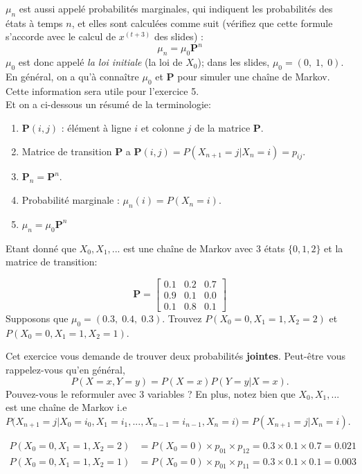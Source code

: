 \begin{Exercice}[15 minutes]
$\mu_n$ est aussi appelé probabilités marginales, qui indiquent les probabilités des états à temps $n$, et elles sont calculées comme suit (vérifiez que cette formule s'accorde avec le calcul de $x^{(t+3)}$ des slides) :
\[ 
\mu_n = \mu_0 \mathbf{P}^n
\]
$\mu_0$ est donc appelé \textit{la loi initiale} (la loi de $X_0$); dans les slides, $\mu_0 = (0,\; 1, \; 0)$. En général, on a qu'à connaître $\mu_0$ et $\mathbf{P}$ pour simuler une chaîne de Markov. Cette information sera utile pour l'exercice 5. \\

Et on a ci-dessous un résumé de la terminologie:

\begin{enumerate}
    \item $\mathbf{P}(i,j)$ : élément à ligne $i$ et colonne $j$ de la matrice $\mathbf{P}$.
    \item Matrice de transition $\mathbf{P}$ a $\mathbf{P}(i,j) = P(X_{n+1}=j|X_n=i)=p_{ij}$.
    \item $\mathbf{P}_n = \mathbf{P}^n$.
    \item Probabilité marginale : $\mu_n(i) = P(X_n = i)$.
    \item $\mu_n = \mu_0 \mathbf{P}^n$
\end{enumerate}

Etant donné que $X_0, X_1, ...$ est une chaîne de Markov avec 3 états $\{0, 1, 2\}$ et la matrice de transition:

\[ 
\mathbf{P} =
\begin{bmatrix}
0.1 & 0.2 & 0.7 \\
0.9 & 0.1 & 0.0 \\
0.1 & 0.8 & 0.1
\end{bmatrix}
\]
Supposons que $\mu_0 = (0.3, \; 0.4, \; 0.3)$. Trouvez $P(X_0 = 0, X_1=1, X_2=2)$ et $P(X_0=0, X_1=1, X_2=1)$.

\begin{conseil}
    Cet exercice vous demande de trouver deux probabilités \textbf{jointes}. Peut-être vous rappelez-vous qu'en général, 
    \[ 
    P(X=x, Y=y) = P(X=x)P(Y=y|X=x).
    \]
    Pouvez-vous le reformuler avec 3 variables ? En plus, notez bien que $X_0, X_1, ...$ est une chaîne de Markov i.e $P\Big(X_{n+1}=j | X_0=i_0, X_1=i_1, ... , X_{n-1}=i_{n-1},X_n=i\Big) = P\left(X_{n+1}=j | X_n=i\right)$. 
\end{conseil}
\begin{solution}
\begin{align}
    P(X_0=0,X_1=1, X_2=2) &= P(X_0 =0)\times p_{01} \times p_{12} = 0.3 \times 0.1 \times 0.7 = 0.021\\
     P(X_0=0,X_1=1, X_2=1)&=P(X_0 =0)\times p_{01} \times p_{11} = 0.3 \times 0.1\times 0.1 = 0.003
\end{align}
\end{solution}
\end{Exercice}

